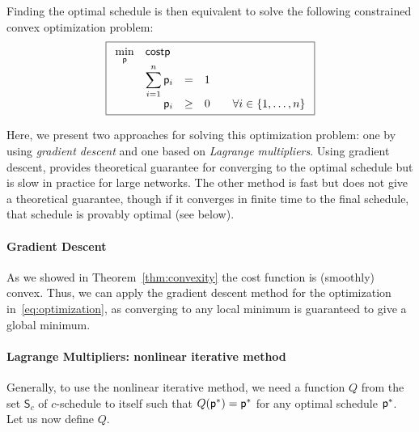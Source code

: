 
Finding the optimal schedule is then equivalent to solve the following
constrained convex optimization problem:
\begin{equation}\label{eq:optimization}
	\boxed{
	\begin{array}{rrclcl}
	\displaystyle \min_{\sched} & \multicolumn{3}{l}{\cost{\sched}} \\
	&\displaystyle \sum_{i=1}^{n} \sched_i & = & 1 \\
	&\sched_i & \geq & 0 & & \forall i \in \{1,\ldots,n\} \\
	\end{array} }
\end{equation}

Here, we present two approaches for solving this optimization problem: one by
using \emph{gradient descent} and one based on \emph{Lagrange multipliers}.
Using gradient descent, provides theoretical guarantee for converging to the
optimal schedule but is slow in practice for large networks. The other method is
fast but does not give a theoretical guarantee, though if it converges in finite
time to the final schedule, that schedule is provably optimal (see below).


\paragraph{Gradient Descent} As we showed in Theorem~\ref{thm:convexity}
the cost function is  (smoothly) convex. Thus, we can apply the gradient descent
method for the optimization in~\eqref{eq:optimization}, as converging to any
local minimum is guaranteed to give a global minimum.

\paragraph{Lagrange Multipliers: nonlinear iterative method} Generally, to use
the nonlinear iterative method, we need a function $Q$ from the set
$\mathsf{S}_c$ of $c$-schedule to itself such that $Q(\mathsf{p}^*) = \mathsf{p}^*$ for
any optimal schedule $\mathsf{p}^*$. Let us now define $Q$.

